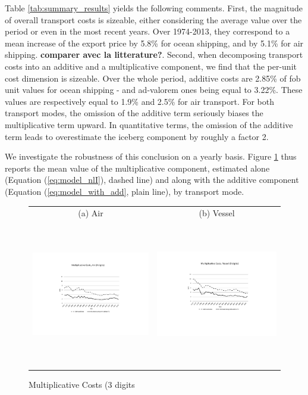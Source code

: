\documentclass[a4paper,11pt]{article}
\begin{document}
Table \ref{tab:summary_results} yields the following comments. First, the magnitude of overall transport costs is sizeable, either considering the average value over the period or even in the most recent years. Over 1974-2013, they correspond to a mean increase of the export price by 5.8\% for ocean shipping, and by 5.1\% for air shipping. \textbf{comparer avec la litterature?}. Second, when decomposing transport costs into an additive and a multiplicative component, we find that the per-unit cost dimension is sizeable. Over the whole period, additive costs are 2.85\% of fob unit values for ocean shipping  - and ad-valorem ones being equal to 3.22\%. These values are respectively equal to 1.9\% and 2.5\% for air transport. For both transport modes, the omission of the additive term seriously biases the multiplicative term upward. In quantitative terms, the omission of the additive term leads to overestimate the iceberg component by roughly a factor 2.

We investigate the robustness of this conclusion on a yearly basis. Figure \ref{fig:mult_alone_withadd} thus reports the mean value of the multiplicative component, estimated alone (Equation (\ref{eq:model_nlI}), dashed line) and along with the additive component (Equation (\ref{eq:model_with_add}, plain line), by transport mode.

\begin{figure}[htbp]
\caption{Multiplicative Costs (3 digits}\label{fig:mult_alone_withadd}
\begin{center}
\begin{tabular}{cc}
{\small (a) Air } & {\small (b) Vessel}\\
\includegraphics[width=3in, height=2.5in]{Fig1a_mult_air_3d.pdf}
& \includegraphics[width=3in,height=2.5in]{Fig1b_mult_vessel_3d.pdf} \\
\end{tabular}
\end{center}
\end{figure}
\end{document}
